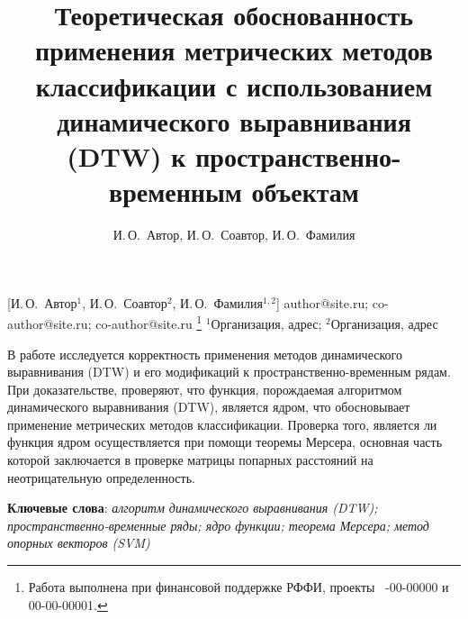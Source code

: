 \documentclass[12pt, twoside]{article}
\begin{document}
\title
    [Обоснованность применения DTW к пространственно-временным объектам] %
    {Теоретическая обоснованность применения метрических методов классификации с использованием динамического выравнивания (DTW) к пространственно-временным объектам}
\author
    [И.\,О.~Автор] %
    {И.\,О.~Автор, И.\,О.~Соавтор, И.\,О.~Фамилия} %
    [И.\,О.~Автор$^1$, И.\,О.~Соавтор$^2$, И.\,О.~Фамилия$^{1,2}$] %
\email
    {author@site.ru; co-author@site.ru;  co-author@site.ru}
\thanks
    {Работа выполнена при
     финансовой поддержке РФФИ, проекты \No\ -00-00000 и 00-00-00001.}
\organization
    {$^1$Организация, адрес; $^2$Организация, адрес}
\abstract
    {В работе исследуется корректность применения методов динамического выравнивания (DTW) и его модификаций к пространственно-временным рядам. При доказательстве, проверяют, что функция, порождаемая алгоритмом динамического выравнивания (DTW), является ядром, что обосновывает применение метрических методов классификации. Проверка того, является ли функция ядром осуществляется при помощи теоремы Мерсера, основная часть которой заключается в проверке матрицы попарных расстояний на неотрицательную определенность. 
	
\bigskip
\noindent
\textbf{Ключевые слова}: \emph {алгоритм динамического выравнивания (DTW); пространственно-временные ряды; ядро функции; теорема Мерсера; метод опорных векторов (SVM)}
}



\maketitle
\linenumbers
\end{document}
